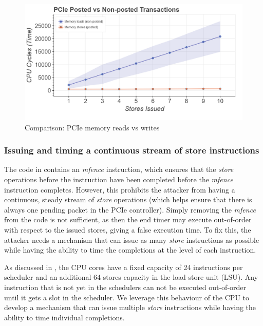\begin{figure}[!htb]
    \centering
    \includegraphics[width=\columnwidth]{figures/interconnect-sc/pcie_mem_reads_v_writes.png}
    \caption{Comparison: PCIe memory reads vs writes}
    \label{fig:pcie-mem-reads-v-writes}
\end{figure}

\subsubsection{Issuing and timing a continuous stream of store instructions}
\label{subsubsec:interconnect-sc-store-ops-challenges-measuring-time}

The code in  contains an \textit{mfence} instruction, which ensures that the \textit{store} operations before the instruction have been completed before the \textit{mfence} instruction completes.
However, this prohibits the attacker from having a continuous, steady stream of \textit{store} operations (which helps ensure that there is always one pending packet in the PCIe controller).
Simply removing the \textit{mfence} from the code is not sufficient, as then the end timer may execute out-of-order with respect to the issued stores, giving a false execution time.
To fix this, the attacker needs a mechanism that can issue as many \textit{store} instructions as possible while having the ability to time the completions at the level of each instruction.

As discussed in , the CPU cores have a fixed capacity of 24 instructions per scheduler and an additional 64 stores capacity in the load-store unit (LSU).
Any instruction that is not yet in the schedulers can not be executed out-of-order until it gets a slot in the scheduler.
We leverage this behaviour of the CPU to develop a mechanism that can issue multiple \textit{store} instructions while having the ability to time individual completions.

